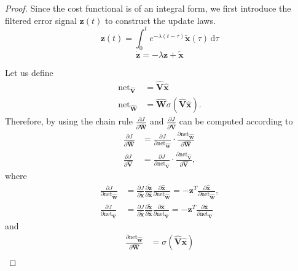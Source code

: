 \documentclass[10pt,twocolumn]{ICCAS}
\newcommand{\ud}{\,\mathrm{d}}
\newcommand{\xtilde}{\tilde{\bm{x}}}
\begin{document}
\begin{proof}
 Since the cost functional is of an integral form, we first introduce the filtered error signal $\bm{z}(t)$ to construct the update laws.
\begin{equation}
    \bm{z}(t) = \int_{0}^{t} e^{-\lambda(t-\tau)} \xtilde(\tau) \ud\tau
    \label{eq:filter_z}
\end{equation}
\begin{equation}
    \dot{\bm{z}} = - \lambda\bm{z} + \xtilde
    \label{eq:filter_z_dot}
\end{equation}

Let us define
\begin{align}
    \text{net}_{\hat{\mathbf{V}}} &= \hat{\mathbf{V}}\hat{\bm{x}}  \\
    \text{net}_{\hat{\mathbf{W}}} &= \hat{\mathbf{W}}\sigma(\hat{\mathbf{V}}\hat{\bm{x}}).
\end{align}
Therefore, by using the chain rule $\frac{\partial J}{\partial \hat{\mathbf{W}}}$ and $\frac{\partial J}{\partial \hat{\mathbf{V}}}$ can be computed according to
\begin{align*}
    \frac{\partial J}{\partial \hat{\mathbf{W}}} &= \frac{\partial J}{\partial \text{net}_{\hat{\mathbf{W}}}} \cdot \frac{\partial \text{net}_{\hat{\mathbf{W}}}}{\partial \hat{\mathbf{W}}} \\
    \frac{\partial J}{\partial \hat{\mathbf{V}}} &= \frac{\partial J}{\partial \text{net}_{\hat{\mathbf{V}}}} \cdot \frac{\partial \text{net}_{\hat{\mathbf{V}}}}{\partial \hat{\mathbf{V}}},
\end{align*}
where
\begin{align}
    \frac{\partial J}{\partial \text{net}_{\hat{\mathbf{W}}}} 
    &= \frac{\partial J}{\partial \tilde{\bm{x}}} \frac{\partial \tilde{\bm{z}}}{\partial \hat{\bm{x}}} \frac{\partial \hat{\bm{x}}}{\partial \text{net}_{\hat{\mathbf{W}}}} = -{\bm{z}}^T \frac{\partial \hat{\bm{x}}}{\partial \text{net}_{\hat{\mathbf{W}}}}, \nonumber \\
    \frac{\partial J}{\partial \text{net}_{\hat{\mathbf{V}}}} 
    &= \frac{\partial J}{\partial \tilde{\bm{x}}} \frac{\partial \tilde{\bm{x}}}{\partial \hat{\bm{x}}} \frac{\partial \hat{\bm{x}}}{\partial \text{net}_{\hat{\mathbf{V}}}} = -{\bm{z}}^T \frac{\partial \hat{\bm{x}}}{\partial \text{net}_{\hat{\mathbf{V}}}}
\end{align}
and
\begin{align}
    \frac{\partial \text{net}_{\hat{\mathbf{W}}}}{\partial \hat{\mathbf{W}}} &= \sigma(\hat{\mathbf{V}}\hat{\bm{x}}) \nonumber \\

\end{align}
\end{proof}
\end{document}
